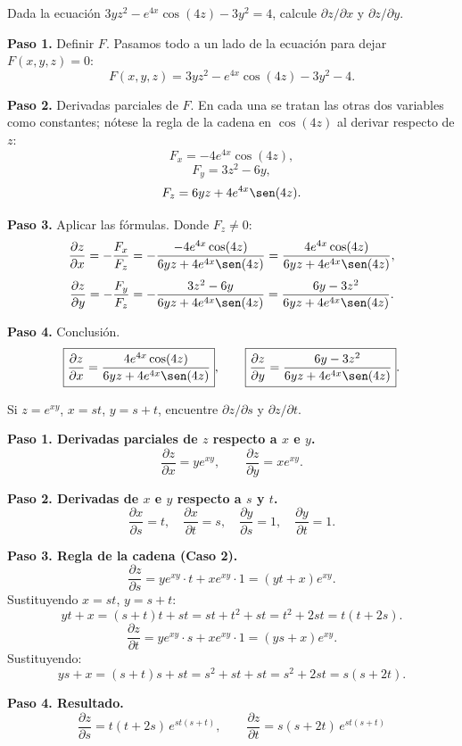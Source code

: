 \begin{example}
Dada la ecuación $3yz^2 - e^{4x}\cos(4z) - 3y^2 = 4$, calcule $\partial z/\partial x$ y $\partial z/\partial y$.
\begin{myproof}
\textbf{Paso 1.} Definir $F$. Pasamos todo a un lado de la ecuación para dejar
$F(x,y,z)=0$:
\[
F(x, y, z) = 3yz^2 - e^{4x}\cos(4z) - 3y^2 - 4.
\]

\textbf{Paso 2.} Derivadas parciales de $F$. En cada una se tratan las otras dos
variables como constantes; nótese la regla de la cadena en $\cos(4z)$ al derivar
respecto de $z$:
\[
F_x = -4e^{4x}\cos(4z),
\]
\[
F_y = 3z^2 - 6y,
\]
\[
F_z = 6yz + 4e^{4x}\sen(4z).
\]

\textbf{Paso 3.} Aplicar las fórmulas. Donde $F_z\neq 0$:
\[
\frac{\partial z}{\partial x} = -\frac{F_x}{F_z} = -\frac{-4e^{4x}\cos(4z)}{6yz + 4e^{4x}\sen(4z)} = \frac{4e^{4x}\cos(4z)}{6yz + 4e^{4x}\sen(4z)},
\]
\[
\frac{\partial z}{\partial y} = -\frac{F_y}{F_z} = -\frac{3z^2 - 6y}{6yz + 4e^{4x}\sen(4z)} = \frac{6y - 3z^2}{6yz + 4e^{4x}\sen(4z)}.
\]

\textbf{Paso 4.} Conclusión.
\[
\boxed{\frac{\partial z}{\partial x} = \frac{4e^{4x}\cos(4z)}{6yz + 4e^{4x}\sen(4z)}},\qquad
\boxed{\frac{\partial z}{\partial y} = \frac{6y - 3z^2}{6yz + 4e^{4x}\sen(4z)}}.
\]
\end{myproof}
\end{example}

\begin{prob}
Si $z = e^{xy}$, $x = s t$, $y = s + t$, encuentre $\partial z/\partial s$ y $\partial z/\partial t$.
\begin{myproof}
\textbf{Paso 1. Derivadas parciales de $z$ respecto a $x$ e $y$.}
\[
\frac{\partial z}{\partial x} = y e^{xy},\qquad \frac{\partial z}{\partial y} = x e^{xy}.
\]

\textbf{Paso 2. Derivadas de $x$ e $y$ respecto a $s$ y $t$.}
\[
\frac{\partial x}{\partial s}=t,\quad \frac{\partial x}{\partial t}=s,\quad
\frac{\partial y}{\partial s}=1,\quad \frac{\partial y}{\partial t}=1.
\]

\textbf{Paso 3. Regla de la cadena (Caso 2).}
\[
\frac{\partial z}{\partial s}
= ye^{xy}\cdot t + xe^{xy}\cdot 1
= (yt+x)e^{xy}.
\]
Sustituyendo $x=st$, $y=s+t$:
\[
yt+x = (s+t)t+st = st+t^2+st = t^2+2st = t(t+2s).
\]
\[
\frac{\partial z}{\partial t}
= ye^{xy}\cdot s + xe^{xy}\cdot 1
= (ys+x)e^{xy}.
\]
Sustituyendo:
\[
ys+x = (s+t)s+st = s^2+st+st = s^2+2st = s(s+2t).
\]

\textbf{Paso 4. Resultado.}
\[
\boxed{\frac{\partial z}{\partial s} = t(t+2s)\,e^{st(s+t)},\qquad
\frac{\partial z}{\partial t} = s(s+2t)\,e^{st(s+t)}}
\]
\end{myproof}
\end{prob}

